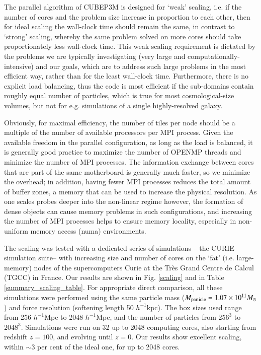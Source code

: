 The parallel algorithm of {\small CUBEP3M} is designed for `weak' 
scaling, i.e. if the number of cores and the problem size 
increase in proportion to each other, then for ideal scaling the 
wall-clock time should remain the same, in contrast to `strong' 
scaling, whereby the same problem solved on more cores should take 
proportionately less wall-clock time. This weak scaling requirement 
is dictated by the problems we are typically investigating (very 
large and computationally-intensive) and our goals, which are to 
address such large problems in the most efficient way, rather than 
for the least wall-clock time. Furthermore, there is no explicit 
load balancing, thus the code is most efficient if the sub-domains
contain roughly equal number of particles, which is true for most
cosmological-size volumes, but not for e.g. simulations of a single
highly-resolved galaxy. 

Obviously, for maximal efficiency, the number of tiles per node should be a multiple of the number of available processors per {\small MPI} process.
Given the available freedom in the parallel configuration, as long as the load is balanced, it is generally good practice to maximize the number of {\small OPENMP} threads and minimize the number of {\small MPI} processes. 
The information exchange between cores that are part of the same motherboard is generally much faster,
so we minimize the overhead; in addition, having fewer {\small MPI} processes reduces the total amount of buffer zones, a memory that can be used to increase the physical resolution. 
As one scales probes deeper into the non-linear regime however, 
the formation of dense objects can cause memory problems in such configurations, and increasing 
the number of {\small MPI} processes helps to ensure memory locality,
especially in non-uniform memory access (numa) environments.




 
The scaling was tested with a dedicated series 
of simulations -- the CURIE simulation suite-- with increasing size and number of cores on the `fat' 
(i.e. large-memory) nodes of the supercomputers Curie at the Tr\`{e}s Grand Centre de Calcul (TGCC) in France. 
Our results are shown in Fig. \ref{scaling} and in 
Table \ref{summary_scaling_table}. For appropriate direct comparison,
all these simulations were performed using the same particle mass 
($M_{\rm particle}=1.07\times10^{11}M_\odot$) and force resolution 
(softening length 50 $h^{-1}$kpc). The box sizes used range from 256 $h^{-1}$Mpc
to 2048 $h^{-1}$Mpc, and the number of particles from $256^3$ to $2048^3$.
Simulations were run on 32 up to 2048 computing cores, also starting from 
redshift $z=100$, and evolving until $z=0$. Our results show excellent scaling, within 
$\sim3$ per cent of the ideal one, for up to 2048 cores. 


